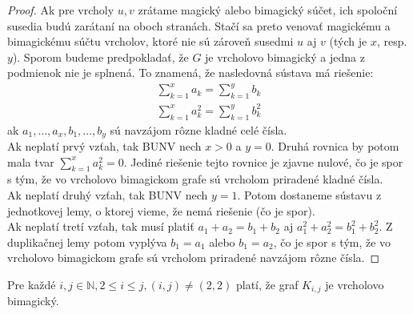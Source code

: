 \begin{proof} Ak pre vrcholy $u,v$ zrátame magický alebo bimagický súčet, ich spoloční susedia budú zarátaní na oboch stranách. Stačí sa preto venovať magickému a bimagickému súčtu vrcholov, ktoré nie sú zároveň susedmi $u$ aj $v$ (tých je $x$, resp. $y$). Sporom budeme predpokladať, že $G$ je vrcholovo bimagický a jedna z podmienok nie je splnená. To znamená, že nasledovná sústava má riešenie:
\begin{gather*}
\sum_{k=1}^{x} a_k = \sum_{k=1}^{y} b_k \\
\sum_{k=1}^{x} a^2_k = \sum_{k=1}^{y} b^2_k
\end{gather*}
ak $a_1, \dots , a_x, b_1, \dots , b_y$ sú navzájom rôzne kladné celé čísla. \\

Ak neplatí prvý vzťah, tak BUNV nech $x > 0$ a $y = 0$. Druhá rovnica by potom mala tvar $\sum_{k=1}^{x} a^2_k = 0$. Jediné riešenie tejto rovnice je zjavne nulové, čo je spor s tým, že vo vrcholovo bimagickom grafe sú vrcholom priradené kladné čísla.  \\

Ak neplatí druhý vzťah, tak BUNV nech $y = 1$. Potom dostaneme sústavu z jednotkovej lemy, o ktorej vieme, že nemá riešenie (čo je spor). \\

Ak neplatí tretí vzťah, tak musí platiť $a_1 + a_2 = b_1 + b_2$ aj $a^2_1 + a^2_2 = b^2_1 + b^2_2$. Z duplikačnej lemy potom vyplýva $b_1 = a_1$ alebo $b_1 = a_2$,  čo je spor s tým, že vo vrcholovo bimagickom grafe sú vrcholom priradené navzájom rôzne čísla.
\end{proof}

\begin{theorem}
\label{vbgkij}
Pre každé  $i,j \in \mathbb{N}, 2 \leq i \leq j, (i, j) \neq (2, 2)$ platí, že graf $K_{i,j}$ je vrcholovo bimagický.
\end{theorem}

